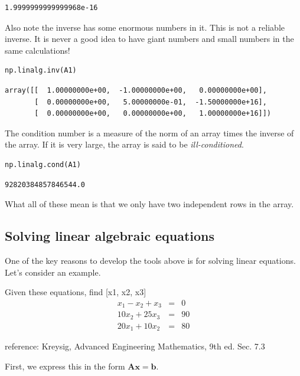 \documentclass[11pt]{article}
\begin{document}
\begin{verbatim}
1.9999999999999968e-16
\end{verbatim}

Also note the inverse has some enormous numbers in it. This is not a reliable inverse. It is never a good idea to have giant numbers and small numbers in the same calculations!

\begin{verbatim}
np.linalg.inv(A1)
\end{verbatim}

\begin{verbatim}
array([[  1.00000000e+00,  -1.00000000e+00,   0.00000000e+00],
       [  0.00000000e+00,   5.00000000e-01,  -1.50000000e+16],
       [  0.00000000e+00,   0.00000000e+00,   1.00000000e+16]])
\end{verbatim}

The condition number is a measure of the norm of an array times the inverse of the array. If it is very large, the array is said to be \emph{ill-conditioned}.

\begin{verbatim}
np.linalg.cond(A1)
\end{verbatim}

\begin{verbatim}
92820384857846544.0
\end{verbatim}

What all of these mean is that we only have two independent rows in the array.

\subsection{Solving linear algebraic equations}
\label{sec:org6fed488}

One of the key reasons to develop the tools above is for solving linear equations. Let's consider an example.

Given these equations, find [x1, x2, x3]
\begin{eqnarray}
x_1 - x_2 + x_3 &=& 0 \\
10 x_2 + 25 x_3 &=& 90 \\
20 x_1 + 10 x_2 &=& 80
\end{eqnarray}

reference: Kreysig, Advanced Engineering Mathematics, 9th ed. Sec. 7.3

First, we express this in the form \(\mathbf{A} \mathbf{x} = \mathbf{b}\).
\end{document}
